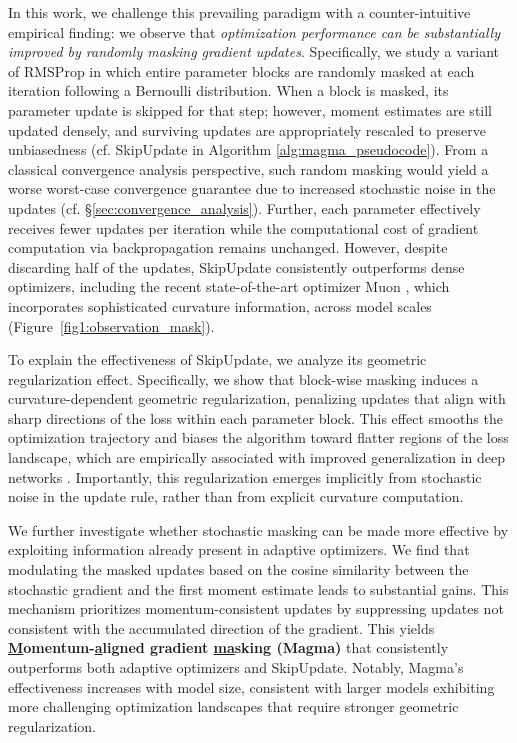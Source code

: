 \documentclass[11pt, a4paper, twocolumn, copyright, goog]{google}
\theoremstyle{plain}
\theoremstyle{definition}
\theoremstyle{remark}
\begin{document}
In this work, we challenge this prevailing paradigm with a counter-intuitive empirical finding: we observe that \emph{optimization performance can be substantially improved by randomly masking gradient updates}.
Specifically, we study a variant of RMSProp \citep{hinton2012rmsprop} in which entire parameter blocks are randomly masked at each iteration following a Bernoulli distribution. When a block is masked, its parameter update is skipped for that step; however, moment estimates are still updated densely, and surviving updates are appropriately rescaled to preserve unbiasedness (cf. SkipUpdate in Algorithm \ref{alg:magma_pseudocode}).
From a classical convergence analysis perspective, such random masking would yield a worse worst-case convergence guarantee due to increased stochastic noise in the updates (cf. \S \ref{sec:convergence_analysis}). Further, each parameter effectively receives fewer updates per iteration while the computational cost of gradient computation via backpropagation remains unchanged.
However, despite discarding half of the updates, SkipUpdate consistently outperforms dense optimizers, including the recent state-of-the-art optimizer Muon \citep{jordan2024muon}, which incorporates sophisticated curvature information, across model scales (Figure~\ref{fig1:observation_mask}).




To explain the effectiveness of SkipUpdate, we analyze its geometric regularization effect.
Specifically, we show that block-wise masking induces a curvature-dependent geometric regularization, penalizing updates that align with sharp directions of the loss within each parameter block.
This effect smooths the optimization trajectory and biases the algorithm toward flatter regions of the loss landscape, which are empirically associated with improved generalization in deep networks \citep{hochreiter1997flat,keskar2016large,jastrzkebski2017three}.
Importantly, this regularization emerges implicitly from stochastic noise in the update rule, rather than from explicit curvature computation.


We further investigate whether stochastic masking can be made more effective by exploiting information already present in adaptive optimizers.
We find that modulating the masked updates based on the cosine similarity between the stochastic gradient and the first moment estimate leads to substantial gains.
This mechanism prioritizes momentum-consistent updates by suppressing updates not consistent with the accumulated direction of the gradient.
This yields \textbf{\underline{M}omentum-\underline{a}ligned \underline{g}radient \underline{ma}sking (Magma)} that consistently outperforms both adaptive optimizers and SkipUpdate.
Notably, Magma’s effectiveness increases with model size, consistent with larger models exhibiting more challenging optimization landscapes that require stronger geometric regularization.
\end{document}
